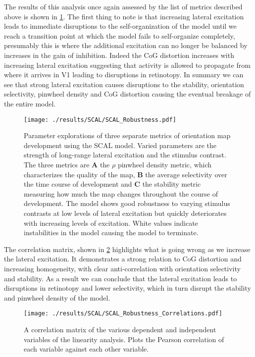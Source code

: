 The results of this analysis once again assessed by the list of
metrics described above is shown in \ref{SCALStability}. The first
thing to note is that increasing lateral excitation leads to immediate
disruptions to the self-organization of the model until we reach a
transition point at which the model fails to self-organize completely,
presumably this is where the additional excitation can no longer be
balanced by increases in the gain of inhibition. Indeed the CoG
distortion increases with increasing lateral excitation suggesting
that activity is allowed to propagate from where it arrives in V1
leading to disruptions in retinotopy. In summary we can see that
strong lateral excitation causes disruptions to the stability,
orientation selectivity, pinwheel density and CoG distortion causing
the eventual breakage of the entire model.

\begin{figure}
	\centering
        \texttt{[image: ./results/SCAL/SCAL\_Robustness.pdf]}
	\caption{Parameter explorations of three separate metrics of
          orientation map development using the SCAL model. Varied
          parameters are the strength of long-range lateral excitation
          and the stimulus contrast. The three metrics are \textbf{A}
          the $\rho$ pinwheel density metric, which characterizes the
          quality of the map, \textbf{B} the average selectivity over
          the time course of development and \textbf{C} the stability
          metric measuring how much the map changes throughout the
          course of development. The model shows good robustness to
          varying stimulus contrasts at low levels of lateral
          excitation but quickly deteriorates with increasing levels
          of excitation. White values indicate instabilities in the
          model causing the model to terminate.}
	\label{SCALStability}
\end{figure}

The correlation matrix, shown in \ref{SCALRobustnessCorr} highlights
what is going wrong as we increase the lateral excitation. It
demonstrates a strong relation to CoG distortion and increasing
homogeneity, with clear anti-correlation with orientation selectivity
and stability. As a result we can conclude that the lateral excitation
leads to disruptions in retinotopy and lower selectivity, which in
turn disrupt the stability and pinwheel density of the model.

\begin{figure}
	\centering
       \texttt{[image: ./results/SCAL/SCAL\_Robustness\_Correlations.pdf]}
	\caption{A correlation matrix of the various dependent and
      independent variables of the linearity analysis. Plots the
      Pearson correlation of each variable against each other
      variable.}
	\label{SCALRobustnessCorr}
\end{figure}

